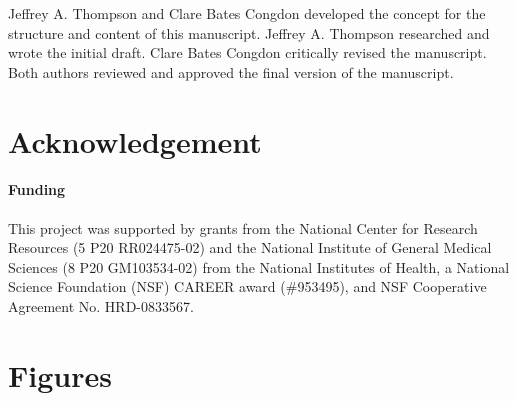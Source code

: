 \documentclass{frontiersENG} %
\begin{document}
Jeffrey A. Thompson and Clare Bates Congdon developed the concept for
the structure and content of this manuscript. Jeffrey A. Thompson
researched and wrote the initial draft. Clare Bates Congdon critically
revised the manuscript. Both authors reviewed and approved the final
version of the manuscript.

\section*{Acknowledgement}

\paragraph{Funding\textcolon} This project was supported by grants from the National Center for
Research Resources (5 P20 RR024475-02) and the National Institute of
General Medical Sciences (8 P20 GM103534-02) from the National
Institutes of Health, a National Science Foundation (NSF) CAREER award
(\#953495), and NSF Cooperative Agreement No. HRD-0833567.



\section*{Figures}



\end{document}
